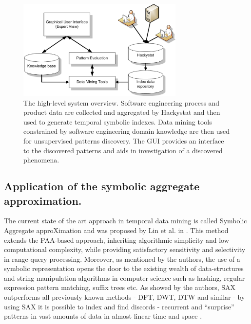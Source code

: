 \documentclass{sig-alternate}
\begin{document}
\begin{figure}[tpb]
   \centering
   \includegraphics[height=50mm]{system_overview.eps}
   \caption{The high-level system overview. Software engineering process and product data are collected and aggregated by Hackystat and then used to generate temporal symbolic indexes. Data mining tools constrained by software engineering domain knowledge are then used for unsupervised patterns discovery. The GUI provides an interface to the discovered patterns and aids in investigation of a discovered phenomena.}
   \label{fig:system_overview}
\end{figure}

\subsection{Application of the symbolic aggregate approximation.}
The current state of the art approach in temporal data mining is called Symbolic Aggregate approXimation and was proposed by Lin et al. in \cite{citeulike:2821475}. This method extends the PAA-based approach, inheriting algorithmic simplicity and low computational complexity, while providing satisfactory sensitivity and selectivity in range-query processing. Moreover, as mentioned by the authors, the use of a symbolic representation opens the door to the existing wealth of data-structures and string-manipulation algorithms in computer science such as hashing, regular expression pattern matching, suffix trees etc. As showed by the authors, SAX outperforms all previously known methods - DFT, DWT, DTW and similar - by using SAX it is possible to index and find discords - recurrent and ``surprise'' patterns in vast amounts of data in almost linear time and space \cite{citeulike:1630245} \cite{citeulike:3025877} \cite{citeulike:3000416}. 
\end{document}
